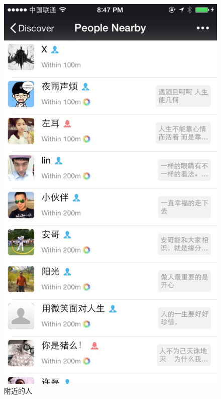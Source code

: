 \begin{figure}[h]
\begin{minipage}[t]{0.25\linewidth}
\includegraphics[width=\textwidth]{img/chap1/Nearby.jpg}
\caption{附近的人\label{instagram}}
\end{minipage}
\hfill
\begin{minipage}[t]{0.25\linewidth}
\centering

\end{minipage}
\end{figure}
